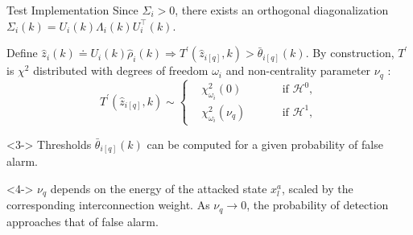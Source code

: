 \documentclass[presentation]{beamer}
\begin{document}
\begin{frame}{Test Implementation}
Since $\Sigma_i > 0$, there exists an orthogonal diagonalization $\Sigma_i(k) = U_i(k) \Lambda_i(k) U_i^\top(k)$. 

\smallskip
Define ${\hat z_i(k) \doteq U_i(k) \hat\rho_i(k)} \Rightarrow T^\prime(\hat z_{i[q]},k) > \bar\theta_{i[q]}(k).$
\bigskip
By construction, $T^\prime$ is $\chi^2$ distributed with degrees of freedom $\omega_i$ and non-centrality parameter $\nu_q$ :
\begin{equation*}
    T^\prime(\hat z_{i[q]},k) \sim \left\lbrace
    \begin{aligned}
        &\chi^2_{\omega_i}(0) \qquad&&\text{if }\mathcal H^0,\\
        &\chi^2_{\omega_i}(\nu_q) &&\text{if }\mathcal H^1,
    \end{aligned}\right.
\end{equation*}
\begin{block}{}<3->
Thresholds $\bar\theta_{i[q]}(k)$ can be computed for a given probability of false alarm.
\end{block}
\begin{block}{}<4->
$\nu_q$ depends on the energy of the attacked state $x_l^a$, scaled by the corresponding interconnection weight. As $\nu_q \rightarrow 0$, the probability of detection approaches that of false alarm.
\end{block}
\end{frame}

\end{document}
